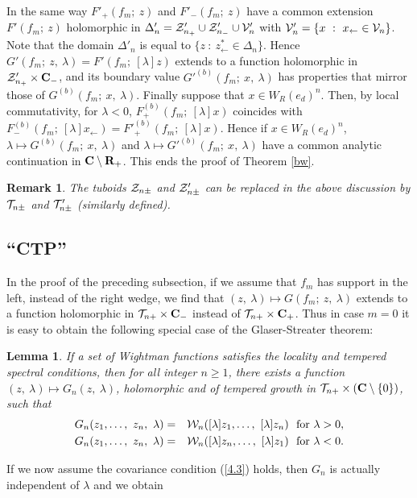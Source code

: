 \documentclass[a4paper,a4paper]{article}
\newtheorem{lemma}{Lemma}[section]
\newtheorem{remark}{Remark}[section]
\def\bC{{\bf C}}
\def\bR{{\bf R}}
\def\TT{{\cal T}}
\def\VV{{\cal V}}
\def\WW{{\cal W}}
\def\ZZ{{\cal Z}}
\begin{document}
In the same way $F'_+(f_m;\ z)$ and $F'_-(f_m;\ z)$ have a common
extension $F'(f_m;\ z)$ holomorphic in
$\Delta'_n = \ZZ'_{n_+} \cup \ZZ'_{n_-} \cup \VV'_n$ with
$\VV'_n = \{x\ :\ x_\leftarrow \in \VV_n\}$. Note that the domain
$\Delta'_n$ is equal to $\{z\ :\ z_\leftarrow^* \in \Delta_n\}$.
Hence $G'(f_m;\ z,\ \lambda) = F'(f_m;\ [\lambda]z)$ extends to
a function holomorphic in $\ZZ'_{n_+} \times \bC_-$, and its
boundary value ${G'}^{(b)}(f_m;\ x,\ \lambda)$
has properties that mirror those of
$G^{(b)}(f_m;\ x,\ \lambda)$. Finally suppose that
$x \in W_R(e_d)^n$. Then, by local commutativity, for $\lambda <0$,
$F_+^{(b)}(f_m;\ [\lambda]x)$ coincides with
$F_-^{(b)}(f_m;\ [\lambda]x_\leftarrow) = {F'}^{(b)}_+(f_m;\ [\lambda]x)$.
Hence if $x \in W_R(e_d)^n$, $\lambda \mapsto G^{(b)}(f_m;\ x,\ \lambda)$
and $\lambda \mapsto {G'}^{(b)}(f_m;\ x,\ \lambda)$ have a common
analytic continuation in $\bC \setminus \bR_+$.
This ends the proof of Theorem \ref{bw}.


\begin{remark}
\label{bwrem}\rm
The tuboids $\ZZ_{n\pm}$ and $\ZZ'_{n\pm}$ can be replaced
in the above discussion
by $\TT_{n\pm}$ and $\TT'_{n\pm}$ (similarly defined).
\end{remark}

\subsection{``CTP''}
In the proof of the preceding subsection, if we assume that
$f_m$ has support in the left, instead of the right wedge,
we find that $(z,\ \lambda) \mapsto G(f_m;\ z,\ \lambda)$
extends to a function holomorphic in $\TT_{n+} \times \bC_-$
instead of $\TT_{n+} \times \bC_+$. Thus in case $m=0$ it is easy
to obtain the following special case of the Glaser-Streater theorem:

\begin{lemma}
\label{bwm=0}
If a set of Wightman functions satisfies the locality and tempered
spectral conditions, then for all integer $n \ge 1$, there
exists a function $(z,\ \lambda) \mapsto G_n(z,\ \lambda)$,
holomorphic and of tempered growth in
$\TT_{n+} \times (\bC \setminus \{0\})$, such that
\begin{eqnarray}
G_n(z_1,\ldots,\ z_n,\ \lambda) &=&
\WW_n([\lambda]z_1,\ldots,\ [\lambda]z_n) \ \ {\rm for}\
\lambda > 0, \nonumber\\
G_n(z_1,\ldots,\ z_n,\ \lambda) &=&
\WW_n([\lambda]z_n,\ldots,\ [\lambda]z_1) \ \ {\rm for}\
\lambda < 0.
\label{5.16}\end{eqnarray}
\end{lemma}
If we now assume the covariance condition (\ref{4.3}) holds,
then $G_n$ is actually independent of $\lambda$ and we obtain
\end{document}
